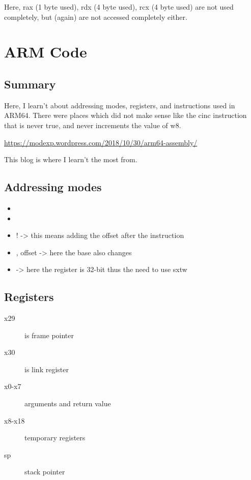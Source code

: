 \documentclass[11pt]{article}
\begin{document}
Here, rax (1 byte used), rdx (4 byte used), rcx (4 byte used) are not used completely, but (again) are not accessed completely either.


\section{ARM Code}
\label{sec:org0efff41}

\subsection{Summary}
\label{sec:org50f73df}
Here, I learn't about addressing modes, registers, and instructions used in ARM64. There were places which did not make sense like the cinc instruction that is never true, and never increments the value of w8.

\url{https://modexp.wordpress.com/2018/10/30/arm64-assembly/}

This blog is where I learn't the most from.


\subsection{Addressing modes}
\label{sec:orgd064d3e}
\begin{itemize}
\item\relax [base]
\item{}
\item{}! -> this means adding the offset after the instruction
\item\relax [base], offset  -> here the base also changes
\item{} -> here the register is 32-bit thus the need to use sxtw
\end{itemize}


\subsection{Registers}
\label{sec:org0becc7b}
\begin{description}
\item[{x29}] is frame pointer
\item[{x30}] is link register
\item[{x0-x7}] arguments and return value
\item[{x8-x18}] temporary registers
\item[{sp}] stack pointer
\end{description}
\end{document}
